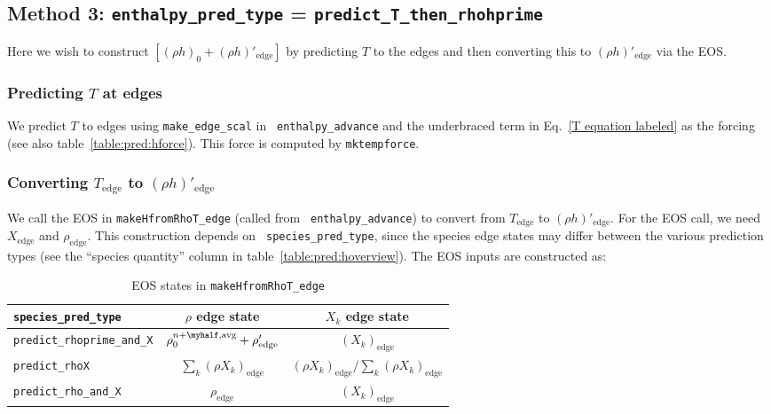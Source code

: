 \subsection{Method 3: {\tt enthalpy\_pred\_type} = {\tt predict\_T\_then\_rhohprime}}

Here we wish to construct $\left [ (\rho h)_0 + (\rho
  h)'_\mathrm{edge} \right ]$ by predicting $T$ to the edges and then
converting this to $(\rho h)'_\mathrm{edge}$ via the EOS.

\subsubsection{Predicting $T$ at edges}

We predict $T$ to edges using {\tt make\_edge\_scal} in {\tt
  enthalpy\_advance} and the underbraced term in Eq.~\ref{T equation
  labeled} as the forcing (see also table~\ref{table:pred:hforce}).
This force is computed by {\tt mktempforce}.

\subsubsection{Converting $T_\mathrm{edge}$ to $(\rho h)'_\mathrm{edge}$}

We call the EOS in {\tt makeHfromRhoT\_edge} (called from {\tt
  enthalpy\_advance}) to convert from $T_\mathrm{edge}$ to $(\rho
h)'_\mathrm{edge}$.  For the EOS call, we need $X_\mathrm{edge}$ and
$\rho_\mathrm{edge}$.  This construction depends on {\tt
  species\_pred\_type}, since the species edge states may differ
between the various prediction types (see the ``species quantity''
column in table~\ref{table:pred:hoverview}).  The EOS inputs are
constructed as:

\begin{table*}[h]
\centering
\caption{EOS states in {\tt makeHfromRhoT\_edge}}
\label{table:pred:EOSinputs}
\renewcommand{\arraystretch}{1.5}
\begin{tabular}{l|c|c}
\hline
\hline
{\tt species\_pred\_type} & {$\rho$ edge state} &   {$X_k$ edge state}  \\
\hline
{\tt predict\_rhoprime\_and\_X} & 
  $\rho_0^{n+\myhalf,\rm{avg}} + \rho'_\mathrm{edge}$ & 
  $(X_k)_\mathrm{edge}$ \\
{\tt predict\_rhoX} & 
  $\sum_k (\rho X_k)_\mathrm{edge}$ & 
  $(\rho X_k)_\mathrm{edge}/\sum_k (\rho X_k)_\mathrm{edge}$ \\
{\tt predict\_rho\_and\_X} & 
  $\rho_\mathrm{edge}$ & 
  $(X_k)_\mathrm{edge}$ \\
\hline
\end{tabular}
\end{table*}

